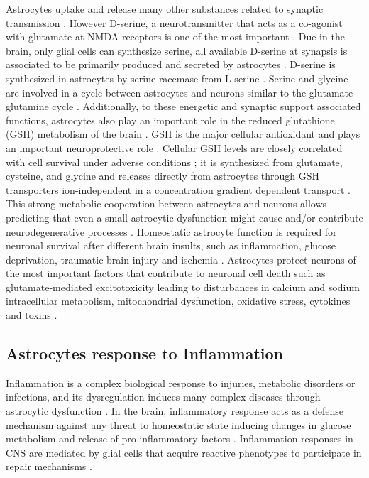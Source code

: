 Astrocytes uptake and release many other substances related to synaptic transmission \cite{Petrelli2016}. However D-serine, a neurotransmitter that acts as a co-agonist with glutamate at NMDA receptors is one of the most important \cite{Halassa2010}. Due in the brain, only glial cells can synthesize serine, all available D-serine at synapsis is associated to be primarily produced and secreted by astrocytes \cite{Barres2008}. D-serine is synthesized in astrocytes by serine racemase from L-serine \cite{Durrant2014}. Serine and glycine are involved in a cycle between astrocytes and neurons similar to the glutamate-glutamine cycle \cite{Cakir2007}. Additionally, to these energetic and synaptic support associated functions, astrocytes also play an important role in the reduced glutathione (GSH) metabolism of the brain \cite{Raps1989}. GSH is the major cellular antioxidant and plays an important neuroprotective role \cite{Jha2016}. Cellular GSH levels are closely correlated with cell survival under adverse conditions \cite{Allaman2011}; it is synthesized from glutamate, cysteine, and glycine and releases directly from astrocytes through GSH transporters ion-independent in a concentration gradient dependent transport \cite{Wang2000}. \\

This strong metabolic cooperation between astrocytes and neurons allows predicting that even a small astrocytic dysfunction might cause and/or contribute neurodegenerative processes \cite{Maragakis2006}. Homeostatic astrocyte function is required for neuronal survival after different brain insults, such as inflammation, glucose deprivation, traumatic brain injury and ischemia \cite{Avila-Rodriguez2014,Jha2016}. Astrocytes protect neurons of the most important factors that contribute to neuronal cell death such as glutamate-mediated excitotoxicity leading to disturbances in calcium and sodium intracellular metabolism, mitochondrial dysfunction, oxidative stress, cytokines and toxins \cite{Takuma2004,Lange2012,Nijboer2013,Hussain2013}.

\subsection*{Astrocytes response to Inflammation}
Inflammation is a complex biological response to injuries, metabolic disorders or infections, and its dysregulation induces many complex diseases through astrocytic dysfunction \cite{Masel2010,Yan2013,Jha2016}. In the brain, inflammatory response acts as a defense mechanism against any threat to homeostatic state inducing changes in glucose metabolism and release of pro-inflammatory factors \cite{Allaman2011}. Inflammation responses in CNS are mediated by glial cells that acquire reactive phenotypes to participate in repair mechanisms \cite{Takuma2004,Fitch2008,Jha2016}. \\

